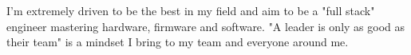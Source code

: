 \documentclass[letter,10pt]{article}
\begin{document}

I'm extremely driven to be the best in my field and aim to be a "full stack" engineer mastering hardware, firmware and software. \newline
"A leader is only as good as their team" is a mindset I bring to my team and everyone around me.
\end{document}
